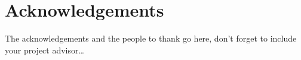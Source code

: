 \thispagestyle{empty}
\section*{Acknowledgements}

The acknowledgements and the people to thank go here, don't forget to include your project advisor\ldots

\newpage
\thispagestyle{empty}
\mbox{}
\newpage